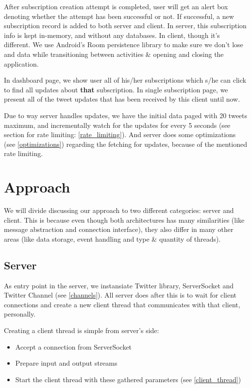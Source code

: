 \documentclass{article}
\begin{document}
\par After subscription creation attempt is completed, user will get an alert box denoting whether the attempt has been successful or not. If successful, a new subscription record is added to both server and client. In server, this subscription info is kept in-memory, and without any databases. In client, though it's different. We use Android's Room\cite{room} persistence library to make sure we don't lose and data while transitioning between activities \& opening and closing the application.

\par In dashboard page, we show user all of his/her subscriptions which s/he can click to find all updates about \textbf{that} subscription. In single subscription page, we present all of the tweet updates that has been received by this client until now.

\par Due to way server handles updates, we have the initial data paged with 20 tweets maximum, and incrementally watch for the updates for every 5 seconds (see section for rate limiting: \ref{rate_limiting}). And server does some optimizations (see \ref{optimizations}) regarding the fetching for updates, because of the mentioned rate limiting.

\newpage

\section{Approach}
We will divide discussing our approach to two different categories: server and client. This is because even though both architectures has many similarities (like message abstraction and connection interface), they also differ in many other areas (like data storage, event handling and type \& quantity of threads).

\subsection{Server}
As entry point in the server, we instansiate Twitter library, ServerSocket and Twitter Channel (see \ref{channels}). All server does after this is to wait for client connections and create a new client thread that communicates with that client, personally.

Creating a client thread is simple from server's side:
\begin{itemize}
  \item Accept a connection from ServerSocket
  \item Prepare input and output streams
  \item Start the client thread with these gathered parameters (see \ref{client_thread})
\end{itemize}
\end{document}
